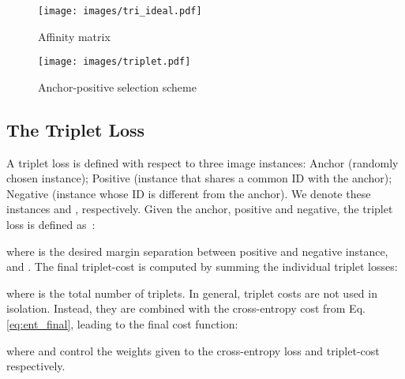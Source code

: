 \documentclass[10pt,twocolumn,letterpaper]{article}
\begin{document}
 \begin{figure*}[h]
     \centering
     \begin{subfigure}[b]{0.25\textwidth}
         \centering
         \texttt{[image: images/tri\_ideal.pdf]}
         \caption{Affinity matrix}
         \label{fig:tri_ideal}
     \end{subfigure}
\begin{subfigure}[b]{0.5\textwidth}
         \centering
         \texttt{[image: images/triplet.pdf]}
         \caption{Anchor-positive selection scheme}
         \label{fig:triplet}
     \end{subfigure}
     \caption{\textbf{Representational Schematic for Relation Preserving Triplet Mining}. In figure \ref{fig:tri_ideal}, each ID contains a number of naturally occurring groups. Relational triplets are based on natural groups rather than IDs, thus preventing pathological anchor-positives. In figure \ref{fig:triplet}, observe that the positive shares clear similarities with the anchor(indicating they share a common natural group) but is not a near-duplicate. }
    \label{fig:rptm}
\end{figure*}

 


\subsection{The Triplet Loss}
\label{sec:tloss}

A triplet loss is defined with respect to three image instances:  Anchor (randomly chosen instance);  Positive (instance that
shares a common  ID with the anchor);  Negative (instance whose ID is different from the anchor).
We denote these instances  and , respectively. Given the anchor, positive and negative, the triplet loss is defined as~\cite{schroff2015facenet}:

where  is the desired margin separation between positive and negative instance,
  and . The final triplet-cost is computed by summing the individual triplet losses: 

where  is the total number of triplets. In general, triplet costs are not used in isolation. Instead,  they are combined with the cross-entropy cost from
Eq. \ref{eq:ent_final}, leading to the final cost function:

where  and  control the weights given to the cross-entropy loss and triplet-cost respectively.
\end{document}
